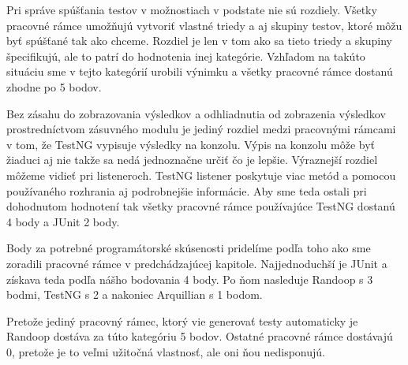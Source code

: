 \documentclass[11pt,twoside,slovak,a4paper]{article}
\begin{document}
	Pri správe spúšťania testov v možnostiach v podstate nie sú rozdiely. Všetky pracovné rámce umožňujú vytvoriť vlastné triedy a aj skupiny testov, ktoré môžu byť spúšťané tak ako chceme. Rozdiel je len v tom ako sa tieto triedy a skupiny špecifikujú, ale to patrí do hodnotenia inej kategórie. Vzhľadom na takúto situáciu sme v tejto kategórií urobili výnimku a všetky pracovné rámce dostanú zhodne po 5 bodov.
	
	Bez zásahu do zobrazovania výsledkov a odhliadnutia od zobrazenia výsledkov prostredníctvom zásuvného modulu je jediný rozdiel medzi pracovnými rámcami v tom, že TestNG vypisuje výsledky na konzolu. Výpis na konzolu môže byť žiaduci aj nie takže sa nedá jednoznačne určiť čo je lepšie. Výraznejší rozdiel môžeme vidieť pri listeneroch. TestNG listener poskytuje viac metód a pomocou používaného rozhrania aj podrobnejšie informácie. Aby sme teda ostali pri dohodnutom hodnotení tak všetky pracovné rámce používajúce TestNG dostanú 4 body a JUnit 2 body.
	
	Body za potrebné programátorské skúsenosti pridelíme podľa toho ako sme zoradili pracovné rámce v predchádzajúcej kapitole. Najjednoduchší je JUnit a získava teda podľa nášho bodovania 4 body. Po ňom nasleduje Randoop s 3 bodmi, TestNG s 2 a nakoniec Arquillian s 1 bodom.	
	
	Pretože jediný pracovný rámec, ktorý vie generovať testy automaticky je Randoop dostáva za túto kategóriu 5 bodov. Ostatné pracovné rámce dostávajú 0, pretože je to veľmi užitočná vlastnosť, ale oni ňou nedisponujú.
\end{document}
